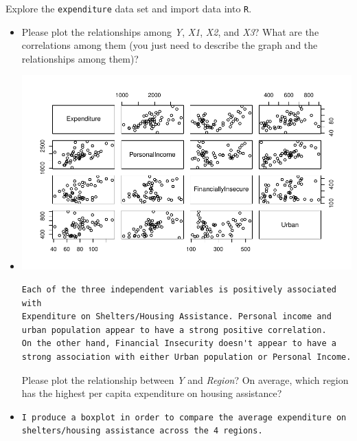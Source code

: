 \documentclass[12pt,letterpaper]{article}
\begin{document}
	\vspace{.5cm}
	\noindent Explore the \texttt{expenditure} data set and import data into \texttt{R}.
	\vspace{.5cm}
	  
	\vspace{.5cm}
	\begin{itemize}
		
		\item
		Please plot the relationships among \emph{Y}, \emph{X1}, \emph{X2}, and \emph{X3}? What are the correlations among them (you just need to describe the graph and the relationships among them)?
		\vspace{.5cm}
		\item
 
\includegraphics[width=.75\textwidth]{pairs_plot}
\begin{verbatim}
Each of the three independent variables is positively associated with
Expenditure on Shelters/Housing Assistance. Personal income and
urban population appear to have a strong positive correlation.
On the other hand, Financial Insecurity doesn't appear to have a
strong association with either Urban population or Personal Income.
\end{verbatim}






		Please plot the relationship between \emph{Y} and \emph{Region}? On average, which region has the highest per capita expenditure on housing assistance?
		\vspace{.5cm}
		\item
\begin{verbatim}
I produce a boxplot in order to compare the average expenditure on
shelters/housing assistance across the 4 regions.
\end{verbatim}


\end{itemize}
\end{document}
